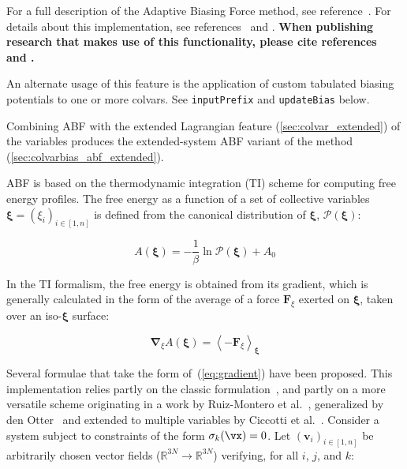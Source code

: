 
For a full description of the Adaptive Biasing Force method, see
reference~\cite{Darve2008}. For details about this implementation,
see references~\cite{Henin2004} and \cite{Henin2010}. \textbf{When
publishing research that makes use of this functionality, please cite
references~\cite{Darve2008} and \cite{Henin2010}.}

An alternate usage of this feature is the application of custom
tabulated biasing potentials to one or more colvars. See
\texttt{inputPrefix} and \texttt{updateBias} below.

Combining ABF with the extended Lagrangian feature (\ref{sec:colvar_extended})
of the variables produces the extended-system ABF variant of the method
(\ref{sec:colvarbias_abf_extended}).

ABF is based on the thermodynamic integration (TI) scheme for
computing free energy profiles. The free energy as a function
of a set of collective variables $\bm{\xi}=(\xi_{i})_{i\in[1,n]}$
is defined from the canonical distribution of $\bm{\xi}$, ${\mathcal P}(\bm{\xi})$:

\begin{equation}
  \label{eq:free}
  A\left(\bm{\xi}\right) = -\frac{1}{\beta} \ln {\mathcal P}(\bm{\xi}) + A_0
\end{equation}

In the TI formalism, the free energy is obtained from its gradient,
which is generally calculated in the form of the average of a force
$\bm{F}_\xi$ exerted on $\bm{\xi}$, taken over an iso-$\bm{\xi}$ surface:

\begin{equation}
  \label{eq:gradient}
  \bm{\nabla}_\xi A\left(\bm{\xi}\right) = \left\langle -\bm{F}_\xi \right\rangle_{\bm{\xi}}
\end{equation}

Several formulae that take the form of~(\ref{eq:gradient}) have been
proposed.  This implementation relies partly on the classic
formulation~\cite{Carter1989}, and partly on a more versatile scheme
originating in a work by Ruiz-Montero et al.~\cite{Ruiz-Montero1997},
generalized by den Otter~\cite{denOtter2000} and extended to multiple
variables by Ciccotti et al.~\cite{Ciccotti2005}.  Consider a system
subject to constraints of the form $\sigma_{k}(\vx) = 0$.  Let
$(\bm{v}_{i})_{i\in[1,n]}$ be arbitrarily chosen vector fields
($\mathbb{R}^{3N}\rightarrow\mathbb{R}^{3N}$) verifying, for all $i$,
$j$, and $k$:

